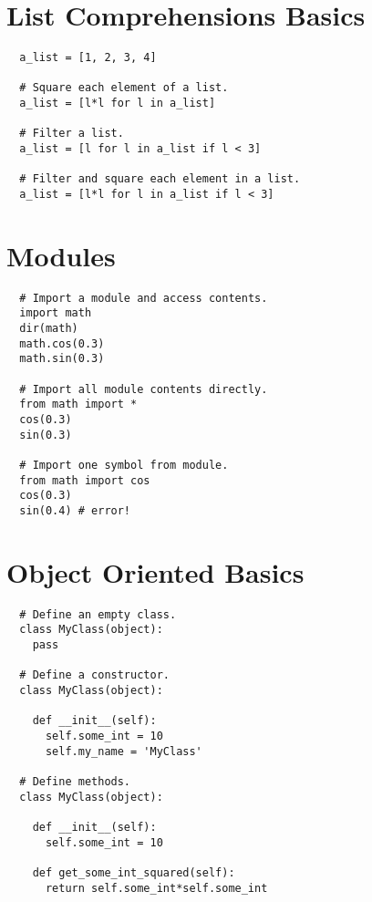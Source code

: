 \documentclass[10pt]{article}
\begin{document}
\section{List Comprehensions Basics}
\begin{lstlisting}
  a_list = [1, 2, 3, 4]

  # Square each element of a list.
  a_list = [l*l for l in a_list]

  # Filter a list.
  a_list = [l for l in a_list if l < 3]

  # Filter and square each element in a list.
  a_list = [l*l for l in a_list if l < 3]
\end{lstlisting}

\section{Modules}
\begin{lstlisting}
  # Import a module and access contents.
  import math
  dir(math)
  math.cos(0.3)
  math.sin(0.3)

  # Import all module contents directly.
  from math import *
  cos(0.3)
  sin(0.3)

  # Import one symbol from module.
  from math import cos
  cos(0.3)
  sin(0.4) # error!
\end{lstlisting}

\section{Object Oriented Basics}
\begin{lstlisting}
  # Define an empty class.
  class MyClass(object):
    pass

  # Define a constructor.
  class MyClass(object):

    def __init__(self):
      self.some_int = 10
      self.my_name = 'MyClass'

  # Define methods.
  class MyClass(object):

    def __init__(self):
      self.some_int = 10

    def get_some_int_squared(self):
      return self.some_int*self.some_int
\end{lstlisting}
\end{document}
